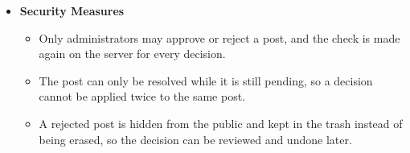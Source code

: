 \begin{itemize}[leftmargin=1.6em,topsep=4pt,itemsep=3pt,parsep=0pt,label=$\bullet$]
\begin{itemize}[leftmargin=2.2em,topsep=2pt,itemsep=3pt,parsep=0pt,label=$\circ$]
            \item \textbf{Item Not Found}: When the post has already been resolved by another administrator, the action fails and the screen shows the message ``Couldn't approve post. Try again.'' or ``Couldn't reject post. Try again.''.
            \item \textbf{Cannot Save the Decision}: When the decision cannot be saved, the post stays in the queue and a message asks the administrator to try again.
            \item \textbf{Lost Connection}: When the connection to the server is lost, the decision is not applied and the screen asks the user to try again.
        \end{itemize}
    \item \textbf{Security Measures}
        \begin{itemize}[leftmargin=2.2em,topsep=2pt,itemsep=3pt,parsep=0pt,label=$\circ$]
            \item Only administrators may approve or reject a post, and the check is made again on the server for every decision.
            \item The post can only be resolved while it is still pending, so a decision cannot be applied twice to the same post.
            \item A rejected post is hidden from the public and kept in the trash instead of being erased, so the decision can be reviewed and undone later.
        \end{itemize}
\end{itemize}







